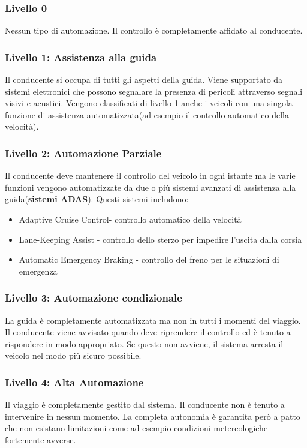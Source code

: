 \subsubsection{Livello 0}
Nessun tipo di automazione. Il controllo è completamente affidato al conducente.
\subsubsection{Livello 1: Assistenza alla guida}
Il conducente si occupa di tutti gli aspetti della guida. Viene supportato da sistemi elettronici che possono  segnalare la presenza di pericoli attraverso segnali visivi e acustici.
Vengono classificati di livello 1 anche i veicoli con una singola funzione di assistenza automatizzata(ad esempio il controllo automatico della velocità).
\subsubsection{Livello 2: Automazione Parziale}
Il conducente deve mantenere il controllo del veicolo in ogni istante ma le  varie funzioni vengono automatizzate da 
due o più sistemi avanzati di assistenza alla guida(\textbf{sistemi ADAS}). Questi sistemi includono:
\begin{itemize}
    \item Adaptive Cruise Control- controllo automatico della velocità
    \item Lane-Keeping Assist - controllo dello sterzo per impedire l'uscita dalla corsia
    \item Automatic Emergency Braking -  controllo del freno per le situazioni di emergenza
\end{itemize}
\subsubsection{Livello 3: Automazione condizionale}
La guida è completamente automatizzata ma non in tutti i momenti del viaggio. Il conducente viene avvisato quando deve riprendere il controllo ed è tenuto a rispondere
in modo appropriato. Se questo non avviene, il sistema arresta il veicolo nel modo più sicuro possibile.
\subsubsection{Livello 4: Alta Automazione}
Il viaggio è completamente gestito dal sistema. Il conducente non è tenuto a intervenire in nessun momento. La completa autonomia è garantita però a patto che non esistano limitazioni come ad esempio condizioni
metereologiche fortemente avverse.
